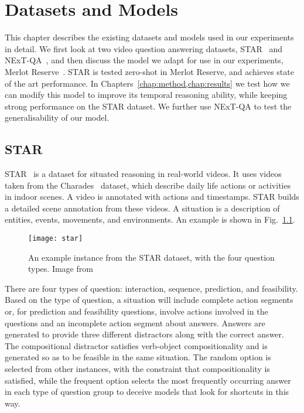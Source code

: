 \chapter{Datasets and Models}
\label{chap:dataset}

This chapter describes the existing datasets and models used in our experiments
in detail.  We first look at two video question answering datasets,
STAR~\citep{wu2021star} and NExT-QA~\citep{xiao2021nextqa}, and then discuss the
model we adapt for use in our experiments, Merlot
Reserve~\citep{zellers2022mreserve}. STAR is tested zero-shot in Merlot Reserve,
and achieves state of the art performance. In
Chapters~\ref{chap:method,chap:results} we test how we can modify this model to
improve its temporal reasoning ability, while keeping strong performance on the
STAR dataset. We further use NExT-QA to test the generalisability of our model.

\section{STAR}

STAR~\citep{wu2021star} is a dataset for situated reasoning in real-world videos.
It uses videos taken from the Charades~\citep{sigurdsson2016charades} dataset,
which describe daily life actions or activities in indoor scenes. A video
is annotated with actions and timestamps. STAR builds a detailed scene annotation
from these videos. A situation is a description of entities, events, movements,
and environments. An example is shown in Fig.~\ref{fig:star}.

\begin{figure}[htpb]
	\centering
	\texttt{[image: star]}
	\caption{An example instance from the STAR dataset, with the four question
		types. Image from~\citet{wu2021star}}
	\label{fig:star}
\end{figure}

There are four types of question: interaction, sequence, prediction, and
feasibility.  Based on the type of question, a situation will include complete
action segments or, for prediction and feasibility questions, involve actions
involved in the questions and an incomplete action segment about answers.
Answers are generated to provide three different distractors along with the
correct answer. The compositional distractor satisfies verb-object
compositionality and is generated so as to be feasible in the same situation.
The random option is selected from other instances, with the constraint that
compositionality is satisfied, while the frequent option selects the most
frequently occurring answer in each type of question group to deceive models
that look for shortcuts in this way.

